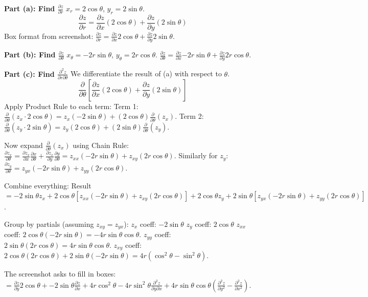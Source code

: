 \documentclass[11pt, letterpaper]{article}
\theoremstyle{definition}
\begin{document}
\textbf{Part (a): Find $\frac{\partial z}{\partial r}$}
$x_r = 2\cos\theta$, $y_r = 2\sin\theta$.
\[ \frac{\partial z}{\partial r} = \frac{\partial z}{\partial x}(2\cos\theta) + \frac{\partial z}{\partial y}(2\sin\theta) \]
Box format from screenshot:
$\frac{\partial z}{\partial r} = \frac{\partial z}{\partial x} \boxed{2\cos\theta} + \frac{\partial z}{\partial y} \boxed{2\sin\theta}$.

\textbf{Part (b): Find $\frac{\partial z}{\partial \theta}$}
$x_\theta = -2r\sin\theta$, $y_\theta = 2r\cos\theta$.
$\frac{\partial z}{\partial \theta} = \frac{\partial z}{\partial x} \boxed{-2r\sin\theta} + \frac{\partial z}{\partial y} \boxed{2r\cos\theta}$.

\textbf{Part (c): Find $\frac{\partial^2 z}{\partial r \partial \theta}$}
We differentiate the result of (a) with respect to $\theta$.
\[ \frac{\partial}{\partial \theta} \left[ \frac{\partial z}{\partial x}(2\cos\theta) + \frac{\partial z}{\partial y}(2\sin\theta) \right] \]
Apply Product Rule to each term:
Term 1: $\frac{\partial}{\partial \theta}(z_x \cdot 2\cos\theta) = z_x(-2\sin\theta) + (2\cos\theta)\frac{\partial}{\partial \theta}(z_x)$.
Term 2: $\frac{\partial}{\partial \theta}(z_y \cdot 2\sin\theta) = z_y(2\cos\theta) + (2\sin\theta)\frac{\partial}{\partial \theta}(z_y)$.

Now expand $\frac{\partial}{\partial \theta}(z_x)$ using Chain Rule:
$\frac{\partial z_x}{\partial \theta} = \frac{\partial z_x}{\partial x}\frac{\partial x}{\partial \theta} + \frac{\partial z_x}{\partial y}\frac{\partial y}{\partial \theta} = z_{xx}(-2r\sin\theta) + z_{xy}(2r\cos\theta)$.
Similarly for $z_y$:
$\frac{\partial z_y}{\partial \theta} = z_{yx}(-2r\sin\theta) + z_{yy}(2r\cos\theta)$.

Combine everything:
Result $= -2\sin\theta z_x + 2\cos\theta [ z_{xx}(-2r\sin\theta) + z_{xy}(2r\cos\theta) ] + 2\cos\theta z_y + 2\sin\theta [ z_{yx}(-2r\sin\theta) + z_{yy}(2r\cos\theta) ]$.

Group by partials (assuming $z_{xy} = z_{yx}$):
$z_x$ coeff: $-2\sin\theta$
$z_y$ coeff: $2\cos\theta$
$z_{xx}$ coeff: $2\cos\theta(-2r\sin\theta) = -4r\sin\theta\cos\theta$.
$z_{yy}$ coeff: $2\sin\theta(2r\cos\theta) = 4r\sin\theta\cos\theta$.
$z_{xy}$ coeff: $2\cos\theta(2r\cos\theta) + 2\sin\theta(-2r\sin\theta) = 4r(\cos^2\theta - \sin^2\theta)$.

The screenshot asks to fill in boxes:
$= \frac{\partial z}{\partial y} \boxed{2\cos\theta} + \boxed{-2\sin\theta} \frac{\partial z}{\partial x} + \boxed{4r\cos^2\theta - 4r\sin^2\theta} \frac{\partial^2 z}{\partial y \partial x} + \boxed{4r\sin\theta\cos\theta} \left( \frac{\partial^2 z}{\partial y^2} - \frac{\partial^2 z}{\partial x^2} \right)$.
\end{document}
